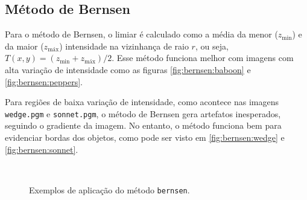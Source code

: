 \subsection{Método de Bernsen} \label{sec:bernsen}

Para o método de Bernsen, o limiar é calculado como a média da menor ($z_\text{min}$) e da maior ($z_\text{máx}$) intensidade na vizinhança de raio $r$, ou seja, $T(x, y) = \left(z_\text{min} + z_\text{máx}\right) / 2$. Esse método funciona melhor com imagens com alta variação de intensidade como as figuras \ref{fig:bernsen:baboon} e \ref{fig:bernsen:peppers}.

Para regiões de baixa variação de intensidade, como acontece nas imagens \texttt{wedge.pgm} e \texttt{sonnet.pgm}, o método de Bernsen gera artefatos inesperados, seguindo o gradiente da imagem. No entanto, o método funciona bem para evidenciar bordas dos objetos, como pode ser visto em \ref{fig:bernsen:wedge} e \ref{fig:bernsen:sonnet}.

\begin{figure}[H]
    \centering
    \\[8pt]

    \caption{Exemplos de aplicação do método \texttt{bernsen}.}
    \label{fig:bernsen}
\end{figure}